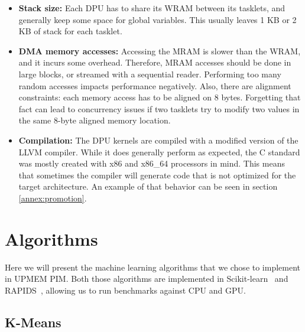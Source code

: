\begin{itemize}
    \item \textbf{Stack size:} Each DPU has to share its WRAM between its tasklets, and generally keep some space for global variables. This usually leaves 1 KB or 2 KB of stack for each tasklet.
    \item \textbf{DMA memory accesses:} Accessing the MRAM is slower than the WRAM, and it incurs some overhead. Therefore, MRAM accesses should be done in large blocks, or streamed with a sequential reader. Performing too many random accesses impacts performance negatively. Also, there are alignment constraints: each memory access has to be aligned on 8 bytes. Forgetting that fact can lead to concurrency issues if two tasklets try to modify two values in the same 8-byte aligned memory location.
    \item \textbf{Compilation:} The DPU kernels are compiled with a modified version of the LLVM compiler. While it does generally perform as expected, the C standard was mostly created with x86 and x86\_64 processors in mind. This means that sometimes the compiler will generate code that is not optimized for the target architecture. An example of that behavior can be seen in section \ref{annex:promotion}.
\end{itemize}

\section{Algorithms}

Here we will present the machine learning algorithms that we chose to implement in UPMEM PIM. Both those algorithms are implemented in Scikit-learn~\cite{pedregosa2011scikit} and RAPIDS~\cite{rapids}, allowing us to run benchmarks against CPU and GPU.

\subsection{K-Means}

